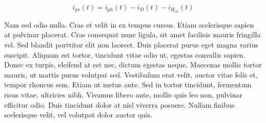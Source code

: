     \begin{equation}
        i_{pv}(t) = i_{ph}(t) - i_{D}(t) - i_{R_{sh}}(t)
        \label{eq:placeholder_equation}
    \end{equation}

Nam sed odio nulla. Cras et velit in ex tempus cursus. Etiam scelerisque sapien at pulvinar placerat. Cras consequat nunc ligula, sit amet facilisis mauris fringilla vel. Sed blandit porttitor elit non laoreet. Duis placerat purus eget magna varius suscipit. Aliquam est tortor, tincidunt vitae odio ut, egestas convallis sapien. Donec ex turpis, eleifend at est nec, dictum egestas neque. Maecenas mollis tortor mauris, ut mattis purus volutpat sed. Vestibulum erat velit, auctor vitae felis et, tempor rhoncus sem. Etiam ut metus ante. Sed in tortor tincidunt, fermentum risus vitae, ultricies nibh. Vivamus libero ante, mollis quis leo non, pulvinar efficitur odio. Duis tincidunt dolor at nisl viverra posuere. Nullam finibus scelerisque velit, vel volutpat dolor auctor quis.